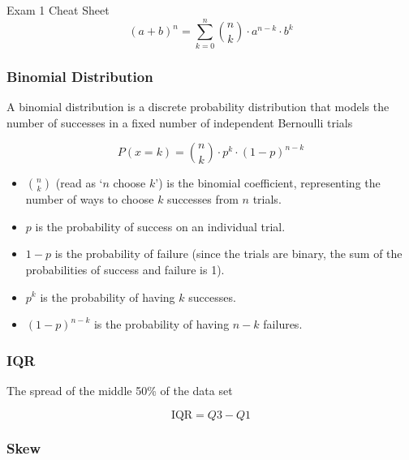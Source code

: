 \begin{cheatsheet}{Exam 1 Cheat Sheet}
    \begin{equation*}
        (a + b)^{n} = \sum_{k = 0}^{n} {n \choose k} \cdot a^{n - k} \cdot b^{k}
    \end{equation*}

    \subsubsection*{Binomial Distribution}

    A binomial distribution is a discrete probability distribution that models the number of successes in a fixed number of independent Bernoulli trials

    \begin{equation*}
        P(x = k) = {n \choose k} \cdot p^{k} \cdot (1 - p)^{n - k}
    \end{equation*}
    \begin{itemize}
        \item $\binom{n}{k}$ (read as `$n$ choose $k$') is the binomial coefficient, representing the number of ways to choose $k$ successes from $n$ trials.
        \item $p$ is the probability of success on an individual trial.
        \item $1 - p$ is the probability of failure (since the trials are binary, the sum of the probabilities of success and failure is 1).
        \item $p^{k}$ is the probability of having $k$ successes.
        \item $(1 - p)^{n - k}$ is the probability of having $n - k$ failures.
    \end{itemize}

    \subsubsection*{IQR}

    The spread of the middle 50\% of the data set

    \begin{equation*}
        \text{IQR} = Q3 - Q1
    \end{equation*}

    \subsubsection*{Skew}


\end{cheatsheet}
